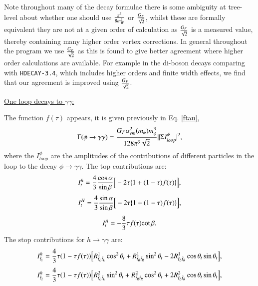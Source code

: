 \documentclass[final,3p,times,pdflatex]{elsarticle}
\begin{document}
Note throughout many of the decay formulae there is some ambiguity at tree-level about whether one should use $g^2 \over 8 m_W^2$ or $G_{F} \over \sqrt{2}$, whilst these are formally equivalent they are not at a given order of calculation as $G_{F} \over \sqrt{2}$ is a measured value, thereby containing many higher order vertex corrections. In general throughout the program we use $G_{F} \over \sqrt{2}$ as this is found to give better agreement where higher order calculations are available. For example in the di-boson decays comparing with {\tt HDECAY-3.4}, which includes higher orders and finite width effects, we find that our agreement is improved using $G_{F} \over \sqrt{2}$.

\underline{One loop decays to $\gamma \gamma$:}

The function $f(\tau)$ appears, it is given previously in Eq. \eqref{ftau},
\begin{equation} \label{phigamgam}
\Gamma (\phi \rightarrow \gamma \gamma) = {G_{F} \alpha_{em}^2 (m_{\phi}) m_{\phi}^3 \over 128 \pi^3 \sqrt{2}}||\Sigma I_{loop}^{\phi}|^2,
\end{equation}
where the $I_{loop}^{\phi}$ are the amplitudes of the contributions of different particles in the loop to the decay $ \phi \rightarrow \gamma \gamma$.
The top contributions are:
\begin{equation}
I_{t}^{h} = {4 \over 3} {\cos \alpha \over \sin \beta} \Big[-2\tau \{1+(1-\tau)f(\tau)\}\Big],
\end{equation}
\begin{equation}
I_{t}^{H} = {4 \over 3} {\sin \alpha \over \sin \beta} \Big[-2\tau \{1+(1-\tau)f(\tau)\}\Big],
\end{equation}
\begin{equation}
I_{t}^{A} = -{8 \over 3}  \tau f(\tau){\cot \beta}.
\end{equation}
The stop contributions for $h \rightarrow \gamma \gamma$ are:
\begin{equation}
I_{\tilde{t}_1}^h = {4 \over 3} \tau (1- \tau f(\tau))\Big[R_{\tilde{t}_L \tilde{t}_L}^1 \cos^2 \theta_t + R_{\tilde{t}_R \tilde{t}_R}^1 \sin^2 \theta_t - 2R_{\tilde{t}_L \tilde{t}_R}^1 \cos\theta_t \sin\theta_t\Big],
\end{equation}
\begin{equation}
I_{\tilde{t}_2}^h = {4 \over 3} \tau (1- \tau f(\tau))\Big[R_{\tilde{t}_L \tilde{t}_L}^2 \sin^2 \theta_t + R_{\tilde{t}_R \tilde{t}_R}^2 \cos^2 \theta_t + 2R_{\tilde{t}_L \tilde{t}_R}^2 \cos\theta_t \sin\theta_t\Big],
\end{equation}
\end{document}

